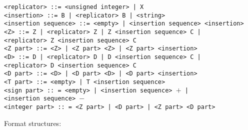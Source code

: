 \documentclass[a4paper,11pt]{article}
\begin{document}
\begin{flushleft}
\vspace{0.2em}\texttt{<replicator> ::= <unsigned integer> | X }\\

\vspace{0.2em}\texttt{<insertion> ::= B | <replicator> B | <string>}\\

\vspace{0.2em}\texttt{<insertion sequence> ::= <empty> | <insertion sequence> <insertion>}\\

\vspace{0.2em}\texttt{<Z> ::= Z | <replicator> Z | Z <insertion sequence> C |\\
  \hspace{1.0cm}<replicator> Z <insertion sequence> C}\\

\vspace{0.2em}\texttt{<Z part> ::= <Z> | <Z part> <Z> | <Z part> <insertion>}\\

\vspace{0.2em}\texttt{<D> ::= D | <replicator> D | D <insertion sequence> C |\\
  \hspace{1.0cm}<replicator> D <insertion sequence> C}\\

\vspace{0.2em}\texttt{<D part> ::= <D> | <D part> <D> | <D part> <insertion>}\\

\vspace{0.2em}\texttt{<T part> ::= <empty> | T <insertion sequence>}\\

\vspace{0.2em}\texttt{<sign part> :: = <empty> | <insertion sequence> $+$ |\\
  \hspace{1.0cm}<insertion sequence> $-$}\\

\vspace{0.2em}\texttt{<integer part> :: = <Z part> | <D part> | <Z part> <D part>}\\
\end{flushleft}

Format structures:
\end{document}
